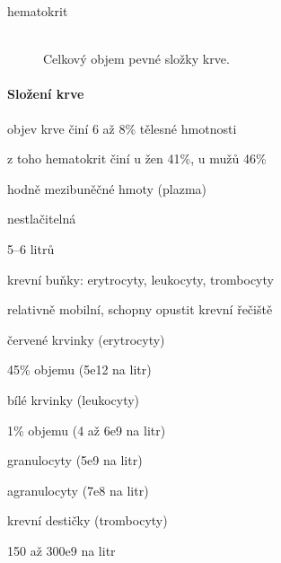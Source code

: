 \documentclass[DIV=8]{scrreprt}
\begin{document}
\begin{description}
\item[hematokrit]\hfill \\
Celkový objem pevné složky krve.

\end{description}


\paragraph{Složení krve}
\begin{myItemize}[nosep]
    \item objev krve činí 6 až 8\% tělesné hmotnosti
\begin{myItemize}[nosep]
    \item z toho hematokrit činí u žen 41\%, u mužů 46\%
\end{myItemize}

    \item hodně mezibuněčné hmoty (plazma)
\begin{myItemize}[nosep]
    \item nestlačitelná
    \item 5--6 litrů
\end{myItemize}

    \item krevní buňky: erytrocyty, leukocyty, trombocyty
\begin{myItemize}[nosep]
    \item relativně mobilní, schopny opustit krevní řečiště
\end{myItemize}

    \item červené krvinky (erytrocyty)
\begin{myItemize}[nosep]
    \item 45\% objemu (\si{5e12} na litr)
\end{myItemize}

    \item bílé krvinky (leukocyty)
\begin{myItemize}[nosep]
    \item 1\% objemu (\si{4} až \si{6e9} na litr)
    \item granulocyty (\si{5e9} na litr)
    \item agranulocyty (\si{7e8} na litr)
\end{myItemize}

    \item krevní destičky (trombocyty)
\begin{myItemize}[nosep]
    \item \si{150} až \si{300e9} na litr
\end{myItemize}

\end{myItemize}
\end{document}
